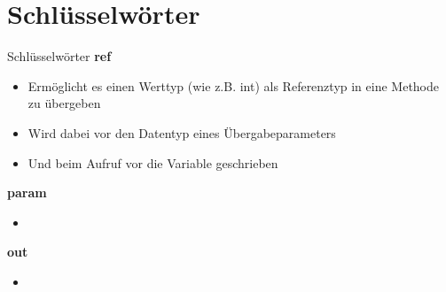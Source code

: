 \section{Schlüsselwörter}
\begin{frame}{Schlüsselwörter}
	\textbf{ref}\\
	\begin{itemize}
		\item Ermöglicht es einen Werttyp (wie z.B. int) als Referenztyp in eine Methode zu übergeben
		\item Wird dabei vor den Datentyp eines Übergabeparameters
		\item Und beim Aufruf vor die Variable geschrieben
	\end{itemize}
	\textbf{param}\\
	\begin{itemize}
		\item 
	\end{itemize}
\end{frame}

\begin{frame}
	\textbf{out}\\
	\begin{itemize}
		\item 
	\end{itemize}
\end{frame}


